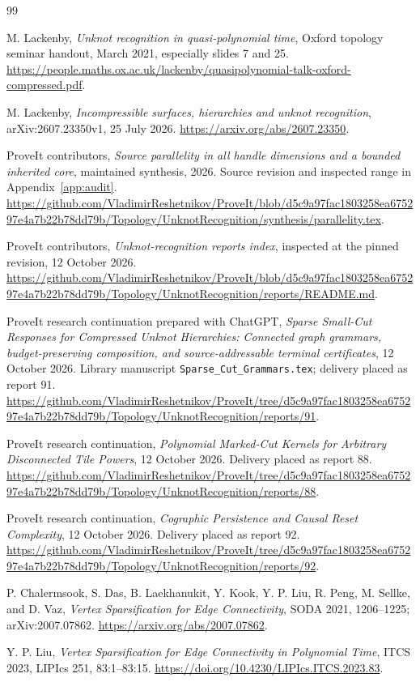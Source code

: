 \documentclass[11pt,letterpaper]{article}
\theoremstyle{definition}
\theoremstyle{remark}\newtheorem{remark}[theorem]{Remark}
\DeclareRobustCommand{\code}[1]{\nolinkurl{#1}}
\begin{document}
\clearpage
\begin{thebibliography}{99}
M. Lackenby, \emph{Unknot recognition in quasi-polynomial time}, Oxford topology seminar handout, March 2021, especially slides 7 and 25.
\url{https://people.maths.ox.ac.uk/lackenby/quasipolynomial-talk-oxford-compressed.pdf}.

M. Lackenby, \emph{Incompressible surfaces, hierarchies and unknot recognition}, arXiv:2607.23350v1, 25 July 2026.
\url{https://arxiv.org/abs/2607.23350}.

ProveIt contributors, \emph{Source parallelity in all handle dimensions and a bounded inherited core}, maintained synthesis, 2026. Source revision and inspected range in Appendix~\ref{app:audit}.
\url{https://github.com/VladimirReshetnikov/ProveIt/blob/d5c9a97fac1803258ea675297e4a7b22b78dd79b/Topology/UnknotRecognition/synthesis/parallelity.tex}.

ProveIt contributors, \emph{Unknot-recognition reports index}, inspected at the pinned revision, 12 October 2026.
\url{https://github.com/VladimirReshetnikov/ProveIt/blob/d5c9a97fac1803258ea675297e4a7b22b78dd79b/Topology/UnknotRecognition/reports/README.md}.

ProveIt research continuation prepared with ChatGPT, \emph{Sparse Small-Cut Responses for Compressed Unknot Hierarchies: Connected graph grammars, budget-preserving composition, and source-addressable terminal certificates}, 12 October 2026. Library manuscript \code{Sparse_Cut_Grammars.tex}; delivery placed as report 91.
\url{https://github.com/VladimirReshetnikov/ProveIt/tree/d5c9a97fac1803258ea675297e4a7b22b78dd79b/Topology/UnknotRecognition/reports/91}.

ProveIt research continuation, \emph{Polynomial Marked-Cut Kernels for Arbitrary Disconnected Tile Powers}, 12 October 2026. Delivery placed as report 88.
\url{https://github.com/VladimirReshetnikov/ProveIt/tree/d5c9a97fac1803258ea675297e4a7b22b78dd79b/Topology/UnknotRecognition/reports/88}.

ProveIt research continuation, \emph{Cographic Persistence and Causal Reset Complexity}, 12 October 2026. Delivery placed as report 92.
\url{https://github.com/VladimirReshetnikov/ProveIt/tree/d5c9a97fac1803258ea675297e4a7b22b78dd79b/Topology/UnknotRecognition/reports/92}.

P. Chalermsook, S. Das, B. Laekhanukit, Y. Kook, Y. P. Liu, R. Peng, M. Sellke, and D. Vaz, \emph{Vertex Sparsification for Edge Connectivity}, SODA 2021, 1206--1225; arXiv:2007.07862.
\url{https://arxiv.org/abs/2007.07862}.

Y. P. Liu, \emph{Vertex Sparsification for Edge Connectivity in Polynomial Time}, ITCS 2023, LIPIcs 251, 83:1--83:15.
\url{https://doi.org/10.4230/LIPIcs.ITCS.2023.83}.
\end{thebibliography}
\end{document}
